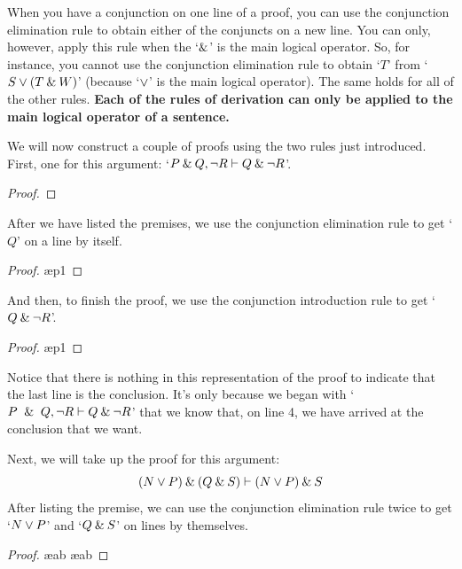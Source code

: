 When you have a conjunction on one line of a proof, you can use the conjunction elimination rule to obtain either of the conjuncts on a new line. You can only, however, apply this rule when the `$\mathbin{\&}$' is the main logical operator. So, for instance, you cannot use the conjunction elimination rule to obtain `$T$' from `$S \vee (T \mathbin{\&} W)$' (because `$\vee$' is the main logical operator). The same holds for all of the other rules. \textbf{Each of the rules of derivation can only be applied to the main logical operator of a sentence.}\label{rule-proofs-main-operator}
\bigskip

\noindent We will now construct a couple of proofs using the two rules just introduced.  First, one for this argument: `$P \mathbin{\&} Q, {\neg} R \vdash Q \mathbin{\&} {\neg} R$'.

\begin{proof}
	 \pr{}
	 \pr{}
\end{proof}\medskip

\noindent After we have listed the premises, we use the conjunction elimination rule to get `$Q$' on a line by itself.

\begin{proof}
	 \pr{}
	 \pr{}
	 \ae{p1}
\end{proof}\medskip

\noindent And then, to finish the proof, we use the conjunction introduction rule to get `$Q \mathbin{\&} {\neg} R$'.

\begin{proof}
	 \pr{}
	 \pr{}
	 \ae{p1}
	 
\end{proof}\medskip
Notice that there is nothing in this representation of the proof to indicate that the last line is the conclusion. It's only because we began with `$P~\mathbin{\&}~Q, {\neg} R \vdash Q \mathbin{\&} {\neg} R$' that we know that, on line 4, we have arrived at the conclusion that we want.

Next, we will take up the proof for this argument: 
$$(N\vee P) \mathbin{\&} (Q \mathbin{\&} S) \vdash (N\vee P)\mathbin{\&} S$$ 
After listing the premise, we can use the conjunction elimination rule twice to get `$N\vee P$' and `$Q\mathbin{\&} S$' on lines by themselves.
\begin{proof}
	 \pr{}
	 \ae{ab}
	 \ae{ab}
\end{proof}

